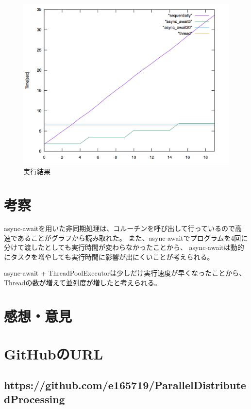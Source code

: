 \documentclass[14pt, oneside]{article}     	%
\begin{document}








\begin{figure}[H]
  \centering
  \includegraphics[width=13cm]{time2.png}
  \caption{実行結果}
  \label{result}
\end{figure}


\section{考察}
async-awaitを用いた非同期処理は、コルーチンを呼び出して行っているので高速であることがグラフから読み取れた。
また、async-awaitでプログラムを4回に分けて渡したとしても実行時間が変わらなかったことから、
async-awaitは動的にタスクを増やしても実行時間に影響が出にくいことが考えられる。

async-await + ThreadPoolExecutorは少しだけ実行速度が早くなったことから、
Threadの数が増えて並列度が増したと考えられる。


\section{感想・意見}
\section{GitHubのURL}
\subsection*{https://github.com/e165719/ParallelDistributedProcessing}
\end{document}
